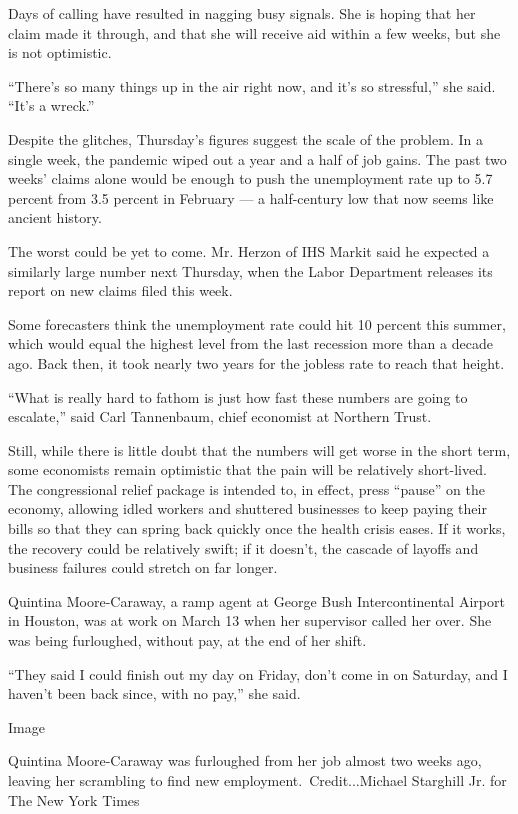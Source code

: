 Days of calling have resulted in nagging busy signals. She is hoping
that her claim made it through, and that she will receive aid within a
few weeks, but she is not optimistic.

``There's so many things up in the air right now, and it's so
stressful,'' she said. ``It's a wreck.''

Despite the glitches, Thursday's figures suggest the scale of the
problem. In a single week, the pandemic wiped out a year and a half of
job gains. The past two weeks' claims alone would be enough to push the
unemployment rate up to 5.7 percent from 3.5 percent in February --- a
half-century low that now seems like ancient history.

The worst could be yet to come. Mr. Herzon of IHS Markit said he
expected a similarly large number next Thursday, when the Labor
Department releases its report on new claims filed this week.

Some forecasters think the unemployment rate could hit 10 percent this
summer, which would equal the highest level from the last recession more
than a decade ago. Back then, it took nearly two years for the jobless
rate to reach that height.

``What is really hard to fathom is just how fast these numbers are going
to escalate,'' said Carl Tannenbaum, chief economist at Northern Trust.

Still, while there is little doubt that the numbers will get worse in
the short term, some economists remain optimistic that the pain will be
relatively short-lived. The congressional relief package is intended to,
in effect, press ``pause'' on the economy, allowing idled workers and
shuttered businesses to keep paying their bills so that they can spring
back quickly once the health crisis eases. If it works, the recovery
could be relatively swift; if it doesn't, the cascade of layoffs and
business failures could stretch on far longer.

Quintina Moore-Caraway, a ramp agent at George Bush Intercontinental
Airport in Houston, was at work on March 13 when her supervisor called
her over. She was being furloughed, without pay, at the end of her
shift.

``They said I could finish out my day on Friday, don't come in on
Saturday, and I haven't been back since, with no pay,'' she said.

Image

Quintina Moore-Caraway was furloughed from her job almost two weeks ago,
leaving her scrambling to find new employment.~Credit...Michael
Starghill Jr. for The New York Times

